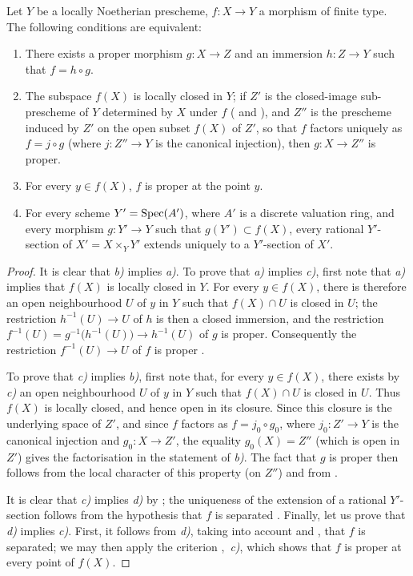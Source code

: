 \begin{corollary}[15.7.6]
\label{IV.15.7.6}
Let $Y$ be a locally Noetherian prescheme, $f:X\to Y$ a morphism of finite type.
The following conditions are equivalent:
\begin{enumerate}[label=\emph{\alph*)}]
  \item There exists a proper morphism $g:X\to Z$ and an immersion $h:Z\to Y$ such that $f=h\circ g$.
  \item The subspace $f(X)$ is locally closed in $Y$; if $Z'$ is the closed-image sub-prescheme of $Y$ determined by $X$ under $f$ ( and ), and $Z''$ is the prescheme induced by $Z'$ on the open subset $f(X)$ of $Z'$, so that $f$ factors uniquely as $f=j\circ g$ (where $j:Z''\to Y$ is the canonical injection), then $g:X\to Z''$ is proper.
  \item For every $y\in f(X)$, $f$ is proper at the point $y$.
  \item For every scheme $Y'=\operatorname{Spec}(A')$, where $A'$ is a discrete valuation ring, and every morphism $g:Y'\to Y$ such that $g(Y')\subset f(X)$, every rational $Y'$-section  of $X'=X\times_Y Y'$ extends uniquely to a $Y'$-section of $X'$.
\end{enumerate}
\end{corollary}

\begin{proof}
It is clear that \emph{b)} implies \emph{a)}. To prove that \emph{a)} implies \emph{c)}, first note that \emph{a)} implies that $f(X)$ is locally closed in $Y$. For every $y\in f(X)$, there is therefore an open neighbourhood $U$
of $y$ in $Y$ such that $f(X)\cap U$ is closed in $U$; the restriction $h^{-1}(U)\to U$ of $h$ is then a closed immersion, and the restriction $f^{-1}(U)=g^{-1}\bigl(h^{-1}(U)\bigr)\longrightarrow h^{-1}(U)$
of $g$ is proper. Consequently the restriction $f^{-1}(U)\to U$ of $f$ is proper .

To prove that \emph{c)} implies \emph{b)}, first note that, for every $y\in f(X)$, there exists by \emph{c)} an open neighbourhood $U$ of $y$ in $Y$ such that $f(X)\cap U$ is closed in $U$. Thus $f(X)$ is locally closed, and hence open in its closure. Since this closure is the underlying space of $Z'$, and since $f$ factors as $f=j_0\circ g_0$, where $j_0:Z'\to Y$ is the canonical injection and $g_0:X\to Z'$, the equality $g_0(X)=Z''$ (which is open in $Z'$) gives the factorisation in the statement of \emph{b)}. The fact that $g$ is proper then follows from the local character of this property (on $Z''$) and from .

It is clear that \emph{c)} implies \emph{d)} by ; the uniqueness of the extension of a rational $Y'$-section follows from the hypothesis that $f$ is separated .
Finally, let us prove that \emph{d)} implies \emph{c)}. First, it follows from \emph{d)}, taking into account  and , that $f$ is separated; we may then apply the criterion ,~\emph{c)}, which shows that $f$ is proper at every point of $f(X)$.
\end{proof}

